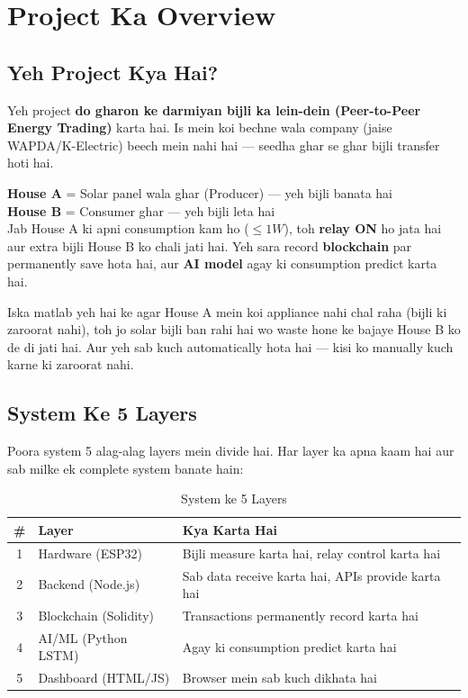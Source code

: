 \chapter{Project Ka Overview}

\section{Yeh Project Kya Hai?}

Yeh project \textbf{do gharon ke darmiyan bijli ka lein-dein (Peer-to-Peer Energy Trading)} karta hai. Is mein koi bechne wala company (jaise WAPDA/K-Electric) beech mein nahi hai --- seedha ghar se ghar bijli transfer hoti hai.

\begin{conceptbox}
\textbf{House A} = Solar panel wala ghar (Producer) --- yeh bijli banata hai\\
\textbf{House B} = Consumer ghar --- yeh bijli leta hai\\[0.3cm]
Jab House A ki apni consumption kam ho ($\leq 1W$), toh \textbf{relay ON} ho jata hai aur extra bijli House B ko chali jati hai. Yeh sara record \textbf{blockchain} par permanently save hota hai, aur \textbf{AI model} agay ki consumption predict karta hai.
\end{conceptbox}

Iska matlab yeh hai ke agar House A mein koi appliance nahi chal raha (bijli ki zaroorat nahi), toh jo solar bijli ban rahi hai wo waste hone ke bajaye House B ko de di jati hai. Aur yeh sab kuch automatically hota hai --- kisi ko manually kuch karne ki zaroorat nahi.

\section{System Ke 5 Layers}

Poora system 5 alag-alag layers mein divide hai. Har layer ka apna kaam hai aur sab milke ek complete system banate hain:

\begin{table}[H]
\centering
\begin{tabularx}{\textwidth}{c l X}
\toprule
\textbf{\#} & \textbf{Layer} & \textbf{Kya Karta Hai} \\
\midrule
1 & Hardware (ESP32) & Bijli measure karta hai, relay control karta hai \\
2 & Backend (Node.js) & Sab data receive karta hai, APIs provide karta hai \\
3 & Blockchain (Solidity) & Transactions permanently record karta hai \\
4 & AI/ML (Python LSTM) & Agay ki consumption predict karta hai \\
5 & Dashboard (HTML/JS) & Browser mein sab kuch dikhata hai \\
\bottomrule
\end{tabularx}
\caption{System ke 5 Layers}
\end{table}

